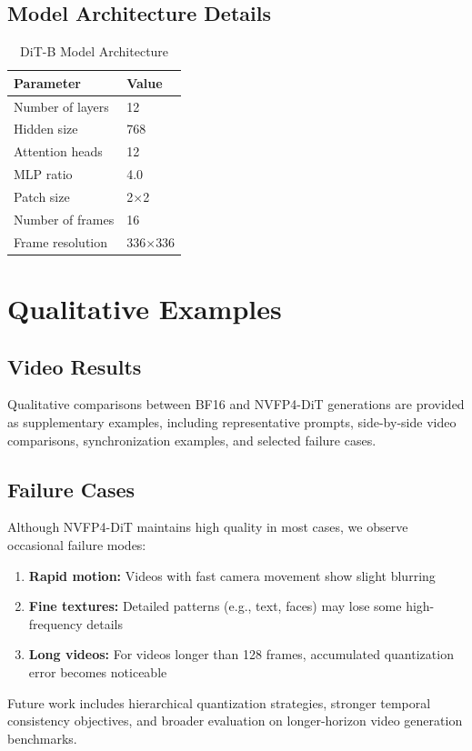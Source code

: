 \documentclass[journal,twoside]{IEEEtran}
\theoremstyle{definition}
\theoremstyle{remark}
\begin{document}
\subsection{Model Architecture Details}

\begin{table}[H]
\centering
\caption{DiT-B Model Architecture}
\label{tab:architecture}
\begin{tabular}{ll}
\toprule
Parameter & Value \\
\midrule
Number of layers & 12 \\
Hidden size & 768 \\
Attention heads & 12 \\
MLP ratio & 4.0 \\
Patch size & 2$\times$2 \\
Number of frames & 16 \\
Frame resolution & 336$\times$336 \\
\bottomrule
\end{tabular}
\end{table}

\FloatBarrier
\section{Qualitative Examples}
\label{app:f}

\subsection{Video Results}

Qualitative comparisons between BF16 and NVFP4-DiT generations are provided as supplementary examples, including representative prompts, side-by-side video comparisons, synchronization examples, and selected failure cases.

\subsection{Failure Cases}

Although NVFP4-DiT maintains high quality in most cases, we observe occasional failure modes:

\begin{enumerate}
    \item \textbf{Rapid motion:} Videos with fast camera movement show slight blurring
    \item \textbf{Fine textures:} Detailed patterns (e.g., text, faces) may lose some high-frequency details
    \item \textbf{Long videos:} For videos longer than 128 frames, accumulated quantization error becomes noticeable
\end{enumerate}

Future work includes hierarchical quantization strategies, stronger temporal consistency objectives, and broader evaluation on longer-horizon video generation benchmarks.
\end{document}
